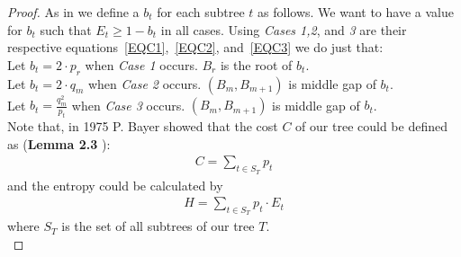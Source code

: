 \documentclass[]{beamer}
\theoremstyle{plain}
\begin{document}
\begin{frame}
\begin{proof}
As in \cite{bayer1975improved} we define a $b_t$ for each subtree $t$ as follows. We want to have a value for $b_t$ such that $E_t \geq 1 - b_t$ in all cases. Using \textit{Cases 1,2}, and \textit{3} are their respective equations~\ref{EQC1},~\ref{EQC2}, and~\ref{EQC3} we do just that: \\
Let $b_t=2\cdot p_r$ when \textit{Case 1} occurs. $B_r$ is the root of $b_t$. \\
Let $b_t=2\cdot q_m$ when \textit{Case 2} occurs. $(B_m, B_{m+1})$ is middle gap of $b_t$. \\
Let $b_t=\frac{q_m^2}{p_t}$ when \textit{Case 3} occurs. $(B_m, B_{m+1})$ is middle gap of $b_t$. \\


Note that, in 1975 P. Bayer showed that the cost $C$ of our tree could be defined as (\textbf{Lemma 2.3} \cite{bayer1975improved}): \\
\begin{align*}
C = \sum_{t \in S_T} p_t
\end{align*}
and the entropy could be calculated by
\begin{align*}
H = \sum_{t \in S_T} p_t \cdot E_t
\end{align*}  
where $S_T$ is the set of all subtrees of our tree $T$. \\


\end{proof}
\end{frame}
\end{document}
